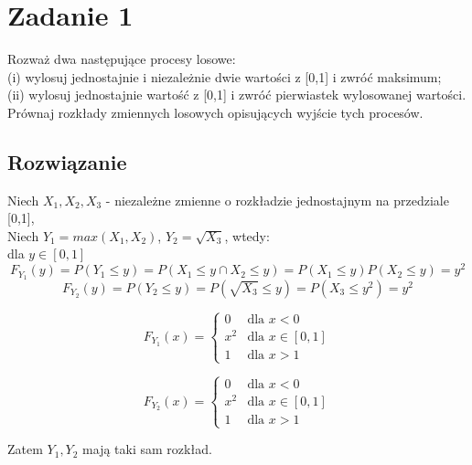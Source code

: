 \section{Zadanie 1}
Rozważ dwa następujące procesy losowe:\\
(i) wylosuj jednostajnie i niezależnie dwie wartości z [0,1] i zwróć maksimum;\\
(ii) wylosuj jednostajnie wartość z [0,1] i zwróć pierwiastek wylosowanej wartości.\\
Prównaj rozkłady zmiennych losowych opisujących wyjście tych procesów.

\subsection*{Rozwiązanie}
Niech \(X_1, X_2, X_3\) - niezależne zmienne o rozkładzie jednostajnym na przedziale [0,1],\\
Niech \(Y_1= max(X_1,X_2)\), \(Y_2 = \sqrt{X_3} \), wtedy:\\
dla \(y \in [0,1]\)\\
\[
	F_{Y_1}(y) = P(Y_1 \le y) = P(X_1 \le y \cap X_2 \le y) = P(X_1 \le y) P(X_2 \le y) = y^2
\]
\[
	F_{Y_2}(y) = P(Y_2 \le y) = P(\sqrt{X_3} \le y) = P(X_3 \le y^2) = y^2
\]

\[
	F_{Y_1}(x) =
	\begin{cases}
		0   & \text{dla } x < 0       \\
		x^2 & \text{dla } x \in [0,1] \\
		1   & \text{dla } x > 1
	\end{cases}
\]

\[
	F_{Y_2}(x) =
	\begin{cases}
		0   & \text{dla } x < 0       \\
		x^2 & \text{dla } x \in [0,1] \\
		1   & \text{dla } x > 1
	\end{cases}
\]

Zatem \(Y_1, Y_2\) mają taki sam rozkład.
